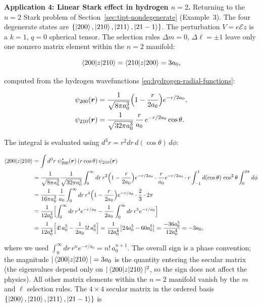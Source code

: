 \medskip\noindent\textbf{Application 4: Linear Stark effect in hydrogen $n=2$.}
Returning to the $n=2$ Stark problem of Section~\ref{sec:tipt-nondegenerate} (Example~3). The four degenerate states are $\{\ket{200},\ket{210},\ket{211},\ket{21-1}\}$. The perturbation $V = e\mathcal{E}z$ is a $k=1$, $q=0$ spherical tensor. The selection rules $\Delta m = 0$, $\Delta\ell = \pm1$ leave only one nonzero matrix element within the $n=2$ manifold:
\begin{linenomath}
\begin{equation*}
\braket{200|z|210} = \braket{210|z|200} = 3a_{0},
\end{equation*}
\end{linenomath}
computed from the hydrogen wavefunctions \eqref{eq:hydrogen-radial-functions}:
\begin{linenomath}
\begin{align*}
\psi_{200}(\bm r) &= \frac{1}{\sqrt{8\pi a_{0}^{3}}}\Bigl(1-\frac{r}{2a_{0}}\Bigr)e^{-r/2a_{0}}, \\
\psi_{210}(\bm r) &= \frac{1}{\sqrt{32\pi a_{0}^{3}}}\,\frac{r}{a_{0}}\,e^{-r/2a_{0}}\cos\theta.
\end{align*}
\end{linenomath}
The integral is evaluated using $d^{3}r = r^{2}dr\,d(\cos\theta)\,d\phi$:
\begin{linenomath}
\begin{align*}
\braket{200|z|210}
&= \int d^{3}r\;\psi_{200}^{*}(\bm r)\,(r\cos\theta)\,\psi_{210}(\bm r) \\
&= \frac{1}{\sqrt{8\pi a_{0}^{3}}}\frac{1}{\sqrt{32\pi a_{0}^{3}}}
   \int_{0}^{\infty}dr\,r^{2}\Bigl(1-\frac{r}{2a_{0}}\Bigr)e^{-r/2a_{0}}
   \cdot \frac{r}{a_{0}}e^{-r/2a_{0}} \cdot r
   \int_{-1}^{1}d(\cos\theta)\,\cos^{2}\theta\int_{0}^{2\pi}d\phi \\
&= \frac{1}{16\pi a_{0}^{3}}\,
   \frac{1}{a_{0}}\int_{0}^{\infty}dr\,r^{4}\Bigl(1-\frac{r}{2a_{0}}\Bigr)e^{-r/a_{0}}
   \cdot \frac{2}{3}\cdot 2\pi \\
&= \frac{1}{12a_{0}^{4}}\Bigl[
   \int_{0}^{\infty}dr\,r^{4}e^{-r/a_{0}}
   - \frac{1}{2a_{0}}\int_{0}^{\infty}dr\,r^{5}e^{-r/a_{0}}
   \Bigr] \\
&= \frac{1}{12a_{0}^{4}}\Bigl[4!\,a_{0}^{5} - \frac{1}{2a_{0}}5!\,a_{0}^{6}\Bigr]
   = \frac{1}{12a_{0}^{4}}\bigl[24a_{0}^{5} - 60a_{0}^{5}\bigr]
   = \frac{-36a_{0}^{5}}{12a_{0}^{4}} = -3a_{0},
\end{align*}
\end{linenomath}
where we used $\int_{0}^{\infty}dr\,r^{n}e^{-r/a_{0}} = n!\,a_{0}^{n+1}$. The overall sign is a phase convention; the magnitude $|\braket{200|z|210}| = 3a_{0}$ is the quantity entering the secular matrix (the eigenvalues depend only on $|\braket{200|z|210}|^{2}$, so the sign does not affect the physics). All other matrix elements within the $n=2$ manifold vanish by the $m$ and $\ell$ selection rules. The $4\times4$ secular matrix in the ordered basis $\{\ket{200},\ket{210},\ket{211},\ket{21-1}\}$ is
